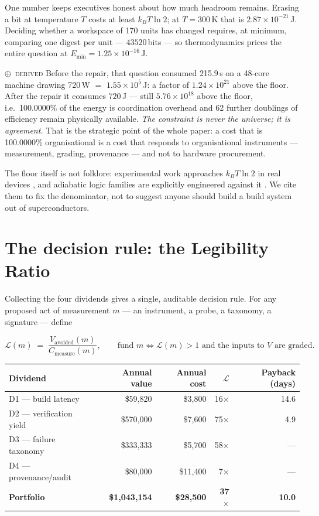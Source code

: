 \documentclass[11pt,a4paper]{article}
\providecommand{\textcite}[1]{\cite{#1}}
\newcommand{\stD}{\textcolor{sigilviolet}{$\oplus$}~{\scriptsize\textsc{derived}}}
\begin{document}
One number keeps executives honest about how much headroom remains. Erasing a bit at temperature $T$ costs at least $k_BT\ln 2$; at $T=300$\,K that is $2.87\times10^{-21}$\,J. Deciding whether a workspace of 170 units has changed requires, at minimum, comparing one digest per unit --- $43520$\,bits --- so thermodynamics prices the entire question at $E_{\min}=1.25\times10^{-16}$\,J.


\stD{} Before the repair, that question consumed 215.9\,s on a 48-core machine drawing 720\,W $=$ $1.55\times10^{5}$\,J: a factor of $1.24\times10^{21}$ above the floor. After the repair it consumes $720$\,J --- still $5.76\times10^{18}$ above the floor, i.e.\ 100.0000\% of the energy is coordination overhead and 62 further doublings of efficiency remain physically available. \emph{The constraint is never the universe; it is agreement.} That is the strategic point of the whole paper: a cost that is 100.0000\% organisational is a cost that responds to organisational instruments --- measurement, grading, provenance --- and not to hardware procurement.


The floor itself is not folklore: experimental work approaches $k_BT\ln2$ in real devices \textcite{arxiv1507_07450}, and adiabatic logic families are explicitly engineered against it \textcite{arxiv2504_04284}. We cite them to fix the denominator, not to suggest anyone should build a build system out of superconductors.


\section{The decision rule: the Legibility Ratio}\label{sec:rule}


Collecting the four dividends gives a single, auditable decision rule. For any proposed act of measurement $m$ --- an instrument, a probe, a taxonomy, a signature --- define


\[ \mathcal{L}(m) \;=\; \frac{V_{\text{avoided}}(m)}{C_{\text{measure}}(m)}, \qquad \text{fund } m \iff \mathcal{L}(m) > 1 \text{ and the inputs to } V \text{ are graded.} \]


\begin{center}\small{}\begin{tabular}{lrrrr}\toprule
Dividend & Annual value & Annual cost & $\mathcal{L}$ & Payback (days) \\\midrule
D1 --- build latency & \$59{,}820 & \$3{,}800 & 16$\times$ & 14.6 \\
D2 --- verification yield & \$570{,}000 & \$7{,}600 & 75$\times$ & 4.9 \\
D3 --- failure taxonomy & \$333{,}333 & \$5{,}700 & 58$\times$ & --- \\
D4 --- provenance/audit & \$80{,}000 & \$11{,}400 & 7$\times$ & --- \\
\midrule
\textbf{Portfolio} & \textbf{\$1{,}043{,}154} & \textbf{\$28{,}500} & \textbf{37$\times$} & \textbf{10.0} \\
\bottomrule\end{tabular}\end{center}
\end{document}
